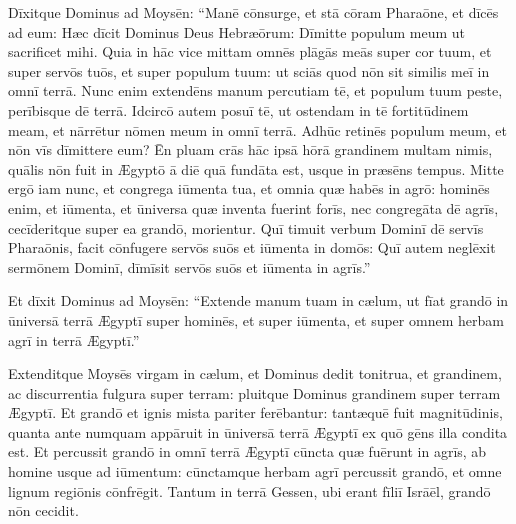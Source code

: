 Dīxitque Dominus ad Moysēn: ``Manē
cōnsurge, et stā cōram Pharaōne, et dīcēs ad eum:
Hæc dīcit Dominus Deus Hebræōrum: Dīmitte populum meum ut sacrificet
mihi.  Quia in hāc vice mittam omnēs 
plāgās meās super
cor tuum, et super servōs tuōs, et super populum tuum: ut sciās quod nōn
sit similis meī in omnī terrā.  Nunc enim extendēns manum percutiam tē,
et populum tuum peste, perībisque dē terrā.  Id\-circō autem posuī tē, ut ostendam in tē fortitūdinem
meam, et nārrētur nōmen meum in omnī terrā.  Adhūc retinēs populum meum,
et nōn vīs dīmittere eum?  Ēn pluam crās hāc ipsā hōrā
grandinem multam nimis, quālis nōn fuit in Ægyptō ā diē quā
fundāta est, usque in præsēns tempus.  Mitte ergō iam nunc, et
congrega iūmenta tua, et omnia quæ habēs in agrō: hominēs
enim, et iūmenta, et ūniversa quæ inventa fuerint forīs, nec
congregāta dē
agrīs, cecīderitque super ea grandō, morientur.  Quī
timuit verbum Dominī dē servīs Pharaōnis, facit cōnfugere
servōs suōs et iūmenta in domōs: Quī autem neglēxit sermōnem Dominī,
dīmīsit servōs suōs et iūmenta in agrīs.''

Et dīxit Dominus ad Moysēn: ``Extende manum tuam in cælum, ut fīat grandō in ūniversā terrā Ægyptī super
hominēs, et super iūmenta, et super omnem herbam agrī in terrā Ægyptī.''

Extenditque Moysēs virgam in cælum, et Dominus dedit
tonitrua, et grandinem, ac discurrentia
fulgura super terram: pluitque Dominus grandinem super
terram Ægyptī.  Et grandō et ignis mista
pariter ferēbantur: tantæquē fuit
magnitūdinis, quanta ante numquam appāruit in ūniversā
terrā Æ\-gyptī ex quō gēns illa condita est.  Et percussit
grandō in omnī terrā Ægyptī cūncta quæ fuērunt in agrīs, ab homine usque ad
iūmentum: cūnctamque herbam agrī percussit grandō, et omne lignum regiōnis
cōnfrēgit.  Tantum in terrā Gessen, ubi erant fīliī
Isrāēl, grandō nōn cecidit.  

